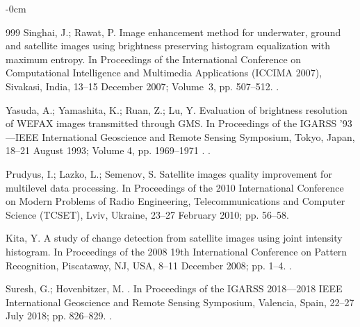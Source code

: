 \documentclass[jimaging,article,accept,pdftex,moreauthors]{Definitions/mdpi}
\begin{document}
\begin{adjustwidth}{-\extralength}{0cm}
\begin{thebibliography}{999}
Singhai, J.; Rawat, P.
\newblock Image enhancement method for underwater, ground and satellite images
  using brightness preserving histogram equalization with maximum entropy.
\newblock In Proceedings of the International Conference on Computational
  Intelligence and Multimedia Applications (ICCIMA 2007), Sivakasi,  India, 13--15 December 2007; Volume~3, pp. 507--512.
. %

Yasuda, A.; Yamashita, K.; Ruan, Z.; Lu, Y.
\newblock Evaluation of brightness resolution of WEFAX images transmitted
  through GMS.
\newblock In Proceedings of the IGARSS '93---IEEE International
  Geoscience and Remote Sensing Symposium, Tokyo, Japan, 18--21 August 1993; Volume 4, pp. 1969--1971 .
. %

Prudyus, I.; Lazko, L.; Semenov, S.
\newblock Satellite images quality improvement for multilevel data processing.
\newblock In Proceedings of the 2010 International Conference on Modern
  Problems of Radio Engineering, Telecommunications and Computer Science
  (TCSET), Lviv, Ukraine, 23--27 February 2010; pp. 56--58. %

Kita, Y.
\newblock A study of change detection from satellite images using joint
  intensity histogram.
\newblock In Proceedings of the 2008 19th International Conference on Pattern
  Recognition, Piscataway, NJ, USA, 8--11 December 2008; pp. 1--4.
. %

Suresh, G.; Hovenbitzer, M.
.
\newblock In Proceedings of the IGARSS 2018---2018 IEEE International
  Geoscience and Remote Sensing Symposium, Valencia, Spain, 22--27 July 2018; pp. 826--829.
. %


\end{thebibliography}
\end{adjustwidth}
\end{document}
